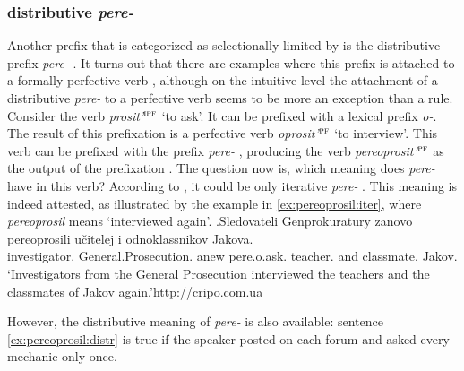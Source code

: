 \subsubsection{distributive  \textit{pere-}  }
Another prefix that is categorized as selectionally limited by \citet{Tatevosov:09} is the distributive  prefix \textit{pere-}  . It turns out that there are examples where this prefix is attached to a formally perfective verb , although on the intuitive level the attachment of a distributive  \textit{pere-}   to a perfective verb  seems to be more an exception than a rule. Consider the verb \textit{prosit'}$^{\textsc{ipf}}$ `to ask'. It can be prefixed with a lexical prefix  \textit{o-}. The result of this prefixation  is a perfective verb  \textit{oprosit'}$^{\textsc{pf}}$ `to interview'. This verb can be prefixed with the prefix \textit{pere-} , producing the verb \textit{pereoprosit'}$^{\textsc{pf}}$ as the output of the prefixation . The question now is, which meaning does \textit{pere-}   have in this verb? According to \citet{Tatevosov:09}, it could be only iterative \textit{pere-}  . This meaning is indeed attested, as illustrated by the example in \ref{ex:pereoprosil:iter}, where \textit{pereoprosil} means `interviewed again'.
\exg.\label{ex:pereoprosil:iter}Sledovateli Genprokuratury zanovo pereoprosili u\v{c}itelej i odnoklassnikov Jakova.\\
investigator. General.Prosecution. anew pere.o.ask. teacher. and classmate. Jakov.\\
\trans `Investigators from the General Prosecution interviewed the teachers and the classmates of Jakov again.'\hbox{}\hfill\hbox{\url{http://cripo.com.ua}}

However, the distributive  meaning of \textit{pere-}   is also available: sentence \ref{ex:pereoprosil:distr} is true if the speaker posted on each forum and asked every mechanic only once.


